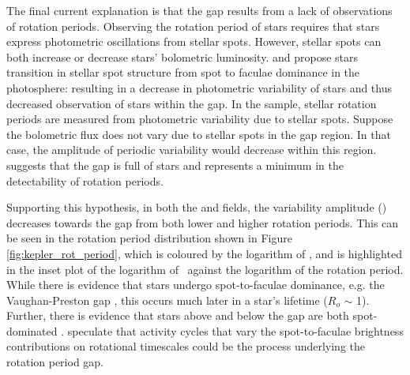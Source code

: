 The final current explanation is that the gap results from a lack of observations of rotation periods.
Observing the rotation period of \kepler{} stars requires that stars express photometric oscillations from stellar spots.
However, stellar spots can both increase or decrease stars' bolometric luminosity.
 \citet{reinhold_fast_2013} and \citet{reinhold_transition_2019} propose stars transition in stellar spot structure from spot to faculae dominance in the photosphere: resulting in a decrease in photometric variability of stars and thus decreased observation of stars within the gap.
In the \citet{mcquillan_rotation_2014} sample, stellar rotation periods are measured from photometric variability due to stellar spots.
Suppose the bolometric flux does not vary due to stellar spots in the gap region. 
In that case, the amplitude of periodic variability would decrease within this region.
\citet{reinhold_transition_2019} suggests that the gap is full of stars and represents a minimum in the detectability of rotation periods.

Supporting this hypothesis, in both the \kepler{} and \ktoo{} fields, the variability amplitude (\rper) decreases towards the gap from both lower and higher rotation periods.
This can be seen in the \citet{mcquillan_rotation_2014} rotation period distribution shown in Figure \ref{fig:kepler_rot_period}, which is coloured by the logarithm of \rper, and is highlighted in the inset plot of the logarithm of \rper \ against the logarithm of the rotation period.
While there is evidence that stars undergo spot-to-faculae dominance, e.g. the Vaughan-Preston gap \citep{vaughan_survey_1980}, this occurs much later in a star's lifetime ($R_o$ $\sim$ 1).
Further, there is evidence that stars above and below the gap are both spot-dominated  \citep{lockwood_patterns_2007, reinhold_transition_2019}.
\citet{reinhold_transition_2019} speculate that activity cycles that vary the spot-to-faculae brightness contributions on rotational timescales could be the process underlying the rotation period gap.

